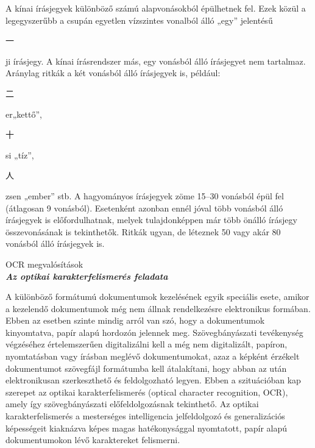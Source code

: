 A kínai írásjegyek különböző számú alapvonásokból épülhetnek fel. Ezek közül a legegyszerűbb a csupán egyetlen vízszintes vonalból álló „egy” jelentésű \begin{CJK*}{UTF8}{gbsn}
一
\end{CJK*} ji írásjegy. A kínai írásrendszer más, egy vonásból álló írásjegyet nem tartalmaz. Aránylag ritkák a két vonásból álló írásjegyek is, például: \begin{CJK*}{UTF8}{gbsn}
二
\end{CJK*} er„kettő”,
\begin{CJK*}{UTF8}{gbsn}
十
\end{CJK*} si „tíz”,
\begin{CJK*}{UTF8}{gbsn}
人
\end{CJK*} zsen „ember” stb. A hagyományos írásjegyek zöme 15–30 vonásból épül fel (átlagosan 9 vonásból). Esetenként azonban ennél jóval több vonásból álló írásjegyek is előfordulhatnak, melyek tulajdonképpen már több önálló írásjegy összevonásának is tekinthetők. Ritkák ugyan, de léteznek 50 vagy akár 80 vonásból álló írásjegyek is.\\

\begin{flushleft}
{\Large OCR megvalósítások}\\

\textit{\textbf{{\large Az optikai karakterfelismerés feladata}}}
\end{flushleft}

A különböző formátumú dokumentumok kezelésének egyik speciális esete, amikor a kezelendő dokumentumok még nem állnak rendelkezésre elektronikus formában. Ebben az esetben szinte mindig arról van szó, hogy a dokumentumok kinyomtatva, papír alapú hordozón jelennek meg. Szövegbányászati tevékenység végzéséhez értelemszerűen digitalizálni kell a még nem digitalizált, papíron, nyomtatásban vagy írásban meglévő dokumentumokat, azaz a képként érzékelt dokumentumot szövegfájl formátumba kell átalakítani, hogy abban az után elektronikusan szerkeszthető és feldolgozható legyen. Ebben a szituációban kap szerepet az optikai karakterfelismerés (optical character recognition, OCR), amely így szövegbányászati előfeldolgozásnak tekinthető. Az optikai karakterfelismerés a mesterséges intelligencia jelfeldolgozó és generalizációs képességeit kiaknázva képes magas hatékonysággal nyomtatott, papír alapú dokumentumokon lévő karaktereket felismerni.\\

